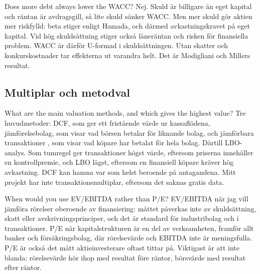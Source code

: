 \begin{fraga}{Does more debt always lower the WACC?}
Nej. Skuld är billigare än eget kapital och räntan är avdragsgill, så lite skuld sänker WACC.
Men mer skuld gör aktien mer riskfylld: beta stiger enligt Hamada, och därmed avkastningskravet
på eget kapital. Vid hög skuldsättning stiger också låneräntan och risken för finansiella
problem. WACC är därför U-formad i skuldsättningen. Utan skatter och konkurskostnader tar
effekterna ut varandra helt. Det är Modigliani och Millers resultat.
\end{fraga}

\subsection{Multiplar och metodval}

\begin{fraga}{What are the main valuation methods, and which gives the highest value?}
Tre huvudmetoder: DCF, som ger ett fristående värde ur kassaflödena, jämförelsebolag, som visar
vad börsen betalar för liknande bolag, och jämförbara transaktioner ,
som visar vad köpare har betalat för hela bolag. Därtill LBO-analys. Som tumregel ger
transaktioner högst värde, eftersom priserna innehåller en kontrollpremie, och LBO lägst,
eftersom en finansiell köpare kräver hög avkastning. DCF kan hamna var som helst beroende på
antagandena. Mitt projekt har inte transaktionsmultiplar, eftersom det saknas gratis data.
\end{fraga}

\begin{fraga}{When would you use EV/EBITDA rather than P/E?}
EV/EBITDA när jag vill jämföra rörelser oberoende av finansiering: måttet påverkas inte av
skuldsättning, skatt eller avskrivningsprinciper, och det är standard för industribolag och i
transaktioner. P/E när kapitalstrukturen är en del av verksamheten, framför allt banker och
försäkringsbolag, där rörelsevärde och EBITDA inte är meningsfulla. P/E är också det mått
aktieinvesterare oftast tittar på. Viktigast är att inte blanda: rörelsevärde hör ihop med
resultat före räntor, börsvärde med resultat efter räntor.
\end{fraga}

